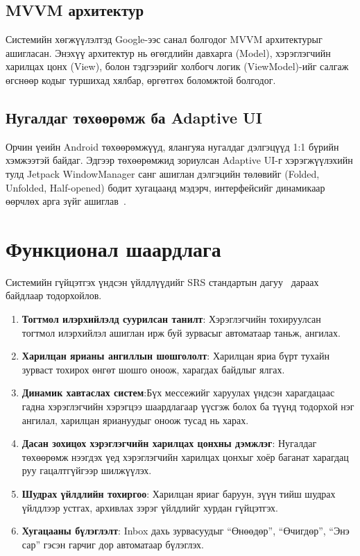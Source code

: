 \subsection{MVVM архитектур}
Системийн хөгжүүлэлтэд Google-ээс санал болгодог MVVM архитектурыг~\cite{android_dev_docs} ашигласан. Энэхүү архитектур нь өгөгдлийн давхарга (Model), хэрэглэгчийн харилцах цонх (View), болон тэдгээрийг холбогч логик (ViewModel)-ийг салгаж өгснөөр кодыг туршихад хялбар, өргөтгөх боломжтой болгодог.

\subsection{Нугалдаг төхөөрөмж ба Adaptive UI}
Орчин үеийн Android төхөөрөмжүүд, ялангуяа нугалдаг дэлгэцүүд 1:1 бүрийн хэмжээтэй байдаг. Эдгээр төхөөрөмжид зориулсан Adaptive UI-г хэрэгжүүлэхийн тулд Jetpack WindowManager санг ашиглан дэлгэцийн төлөвийг (Folded, Unfolded, Half-opened) бодит хугацаанд мэдэрч, интерфейсийг динамикаар өөрчлөх арга зүйг ашиглав~\cite{foldable_guide}.

\section{Функционал шаардлага}
Системийн гүйцэтгэх үндсэн үйлдлүүдийг SRS стандартын дагуу~\cite{ieee1998srs} дараах байдлаар тодорхойлов.
\begin{enumerate}[label=FR\arabic*.]
    \item \textbf{Тогтмол илэрхийлэлд суурилсан танилт}: Хэрэглэгчийн тохируулсан тогтмол илэрхийлэл ашиглан ирж буй зурвасыг автоматаар таньж, ангилах.
    \item \textbf{Харилцан ярианы ангиллын шошгололт}: Харилцан яриа бүрт тухайн зурваст тохирох өнгөт шошго оноож, харагдах байдлыг ялгах.
    \item \textbf{Динамик хавтаслах систем}:Бүх мессежийг харуулах үндсэн харагдацаас гадна хэрэглэгчийн хэрэгцээ шаардлагаар үүсгэж болох ба түүнд тодорхой нэг ангилал, харилцан яриануудыг оноож тусад нь харах.
    \item \textbf{Дасан зохицох хэрэглэгчийн харилцах цонхны дэмжлэг}: Нугалдаг төхөөрөмж нээгдэх үед хэрэглэгчийн харилцах цонхыг хоёр баганат харагдац руу гацалтгүйгээр шилжүүлэх.
    \item \textbf{Шудрах үйлдлийн тохиргоо}: Харилцан яриаг баруун, зүүн тийш шудрах үйлдлээр устгах, архивлах зэрэг үйлдлийг хурдан гүйцэтгэх.
    \item \textbf{Хугацааны бүлэглэлт}: Inbox дахь зурвасуудыг ``Өнөөдөр'', ``Өчигдөр'', ``Энэ сар'' гэсэн гарчиг дор автоматаар бүлэглэх.
\end{enumerate}


